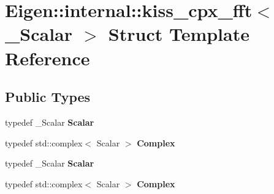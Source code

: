 \hypertarget{struct_eigen_1_1internal_1_1kiss__cpx__fft}{}\section{Eigen\+:\+:internal\+:\+:kiss\+\_\+cpx\+\_\+fft$<$ \+\_\+\+Scalar $>$ Struct Template Reference}
\label{struct_eigen_1_1internal_1_1kiss__cpx__fft}
\subsection*{Public Types}
\begin{DoxyCompactItemize}
\item 
\mbox{\label{struct_eigen_1_1internal_1_1kiss__cpx__fft_a806bd268f40020d2a0610351e4287261}} 
typedef \+\_\+\+Scalar {\bfseries Scalar}
\item 
\mbox{\label{struct_eigen_1_1internal_1_1kiss__cpx__fft_aef8846826abbab3cf75ab0c1c32d7a45}} 
typedef std\+::complex$<$ Scalar $>$ {\bfseries Complex}
\item 
\mbox{\label{struct_eigen_1_1internal_1_1kiss__cpx__fft_a806bd268f40020d2a0610351e4287261}} 
typedef \+\_\+\+Scalar {\bfseries Scalar}
\item 
\mbox{\label{struct_eigen_1_1internal_1_1kiss__cpx__fft_aef8846826abbab3cf75ab0c1c32d7a45}} 
typedef std\+::complex$<$ Scalar $>$ {\bfseries Complex}
\end{DoxyCompactItemize}
